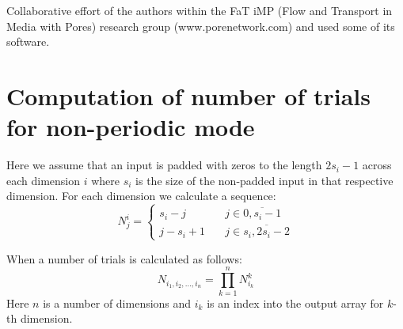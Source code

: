 \documentclass[1p]{elsarticle}
\begin{document}
Collaborative effort of the authors within the FaT iMP (Flow and Transport in
Media with Pores) research group (www.porenetwork.com) and used some of its
software.

\appendix
\section{Computation of number of trials for non-periodic mode}
\label{sec:number-of-trials}
Here we assume that an input is padded with zeros to the length $2s_i - 1$
across each dimension $i$ where $s_i$ is the size of the non-padded input in
that respective dimension. For each dimension we calculate a sequence:
\begin{equation*}
  N^i_j = \left\{
  \begin{array}{cc}
    s_i - j & \quad j \in \overline{0, s_i-1} \\
    j - s_i + 1 & \quad j \in \overline{s_i, 2s_i-2}
  \end{array}
  \right.
\end{equation*}

When a number of trials is calculated as follows:
\begin{equation*}
  N_{i_1, i_2, \dots, i_n} = \prod_{k=1}^n N^k_{i_k}
\end{equation*}
Here $n$ is a number of dimensions and $i_k$ is an index into the output array
for $k$-th dimension.



\end{document}
